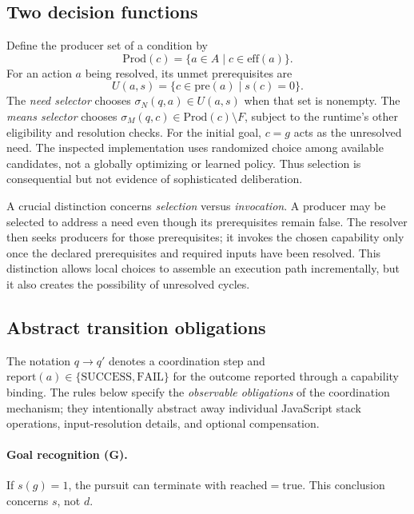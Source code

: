 \documentclass[11pt]{article}
\begin{document}
\subsection{Two decision functions}
Define the producer set of a condition by
\begin{equation}
\mathrm{Prod}(c)=\{a\in A\mid c\in\mathrm{eff}(a)\}.
\end{equation}
For an action $a$ being resolved, its unmet prerequisites are
\begin{equation}
U(a,s)=\{c\in\mathrm{pre}(a)\mid s(c)=0\}.
\end{equation}
The \emph{need selector} chooses $\sigma_N(q,a)\in U(a,s)$ when that set is nonempty. The \emph{means selector} chooses $\sigma_M(q,c)\in\mathrm{Prod}(c)\setminus F$, subject to the runtime's other eligibility and resolution checks. For the initial goal, $c=g$ acts as the unresolved need. The inspected implementation uses randomized choice among available candidates, not a globally optimizing or learned policy. Thus selection is consequential but not evidence of sophisticated deliberation.

A crucial distinction concerns \emph{selection} versus \emph{invocation}. A producer may be selected to address a need even though its prerequisites remain false. The resolver then seeks producers for those prerequisites; it invokes the chosen capability only once the declared prerequisites and required inputs have been resolved. This distinction allows local choices to assemble an execution path incrementally, but it also creates the possibility of unresolved cycles.

\subsection{Abstract transition obligations}
The notation $q\longrightarrow q'$ denotes a coordination step and $\mathrm{report}(a)\in\{\mathrm{SUCCESS},\mathrm{FAIL}\}$ for the outcome reported through a capability binding. The rules below specify the \emph{observable obligations} of the coordination mechanism; they intentionally abstract away individual JavaScript stack operations, input-resolution details, and optional compensation.

\paragraph{Goal recognition (G).} If $s(g)=1$, the pursuit can terminate with $\mathrm{reached}=\mathrm{true}$. This conclusion concerns $s$, not $d$.
\end{document}
